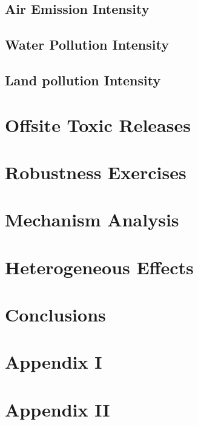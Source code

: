 \documentclass[12pt, english]{article}
\begin{document}
    \subsection{Air Emission Intensity}\label{subsec:air-emission-intensity}

    \subsection{Water Pollution Intensity}\label{subsec:water-pollution-intensity}

    \subsection{Land pollution Intensity}\label{subsec:land-pollution-intensity}


    \section{Offsite Toxic Releases}\label{sec:offsite-toxic-releases}


    \section{Robustness Exercises}\label{sec:robustness-exercises}


    \section{Mechanism Analysis}\label{sec:mechanism-analysis}


    \section{Heterogeneous Effects}\label{sec:heterogeneous-effects}


    \section{Conclusions}\label{sec:conclusions}

    \newpage
    \begin{appendices}
        \section*{Appendix I}\label{sec:appendix-i}
        
        \section*{Appendix II}\label{sec:appendix-ii}
        
    \end{appendices}
\end{document}
